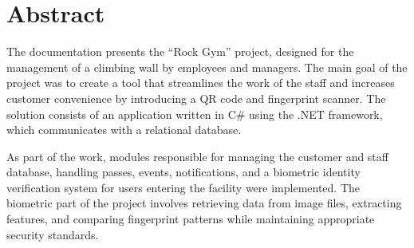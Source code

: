 \chapter*{Abstract}
\label{cha:abstract-en}

The documentation presents the ``Rock Gym'' project, designed for the management of a climbing wall by employees and managers. The main goal of the project was to create a tool that streamlines the work of the staff and increases customer convenience by introducing a QR code and fingerprint scanner. The solution consists of an application written in C\# using the .NET framework, which communicates with a relational database.

As part of the work, modules responsible for managing the customer and staff database, handling passes, events, notifications, and a biometric identity verification system for users entering the facility were implemented. The biometric part of the project involves retrieving data from image files, extracting features, and comparing fingerprint patterns while maintaining appropriate security standards.
